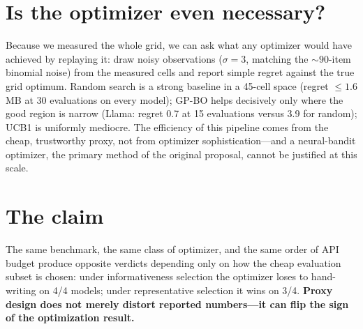 \section{Is the optimizer even necessary?}

Because we measured the whole grid, we can ask what any optimizer would have achieved by
replaying it: draw noisy observations ($\sigma=3$, matching the ${\sim}90$-item binomial noise)
from the measured cells and report simple regret against the true grid optimum. Random search
is a strong baseline in a 45-cell space (regret $\leq 1.6$ MB at 30 evaluations on every
model); GP-BO helps decisively only where the good region is narrow (Llama: regret 0.7 at 15
evaluations versus 3.9 for random); UCB1 is uniformly mediocre. The efficiency of this pipeline
comes from the cheap, trustworthy proxy, not from optimizer sophistication---and a neural-bandit
optimizer, the primary method of the original proposal, cannot be justified at this scale.

\section{The claim}

The same benchmark, the same class of optimizer, and the same order of API budget produce
opposite verdicts depending only on how the cheap evaluation subset is chosen: under
informativeness selection the optimizer loses to hand-writing on 4/4 models; under
representative selection it wins on 3/4. \textbf{Proxy design does not merely distort reported
numbers---it can flip the sign of the optimization result.}
